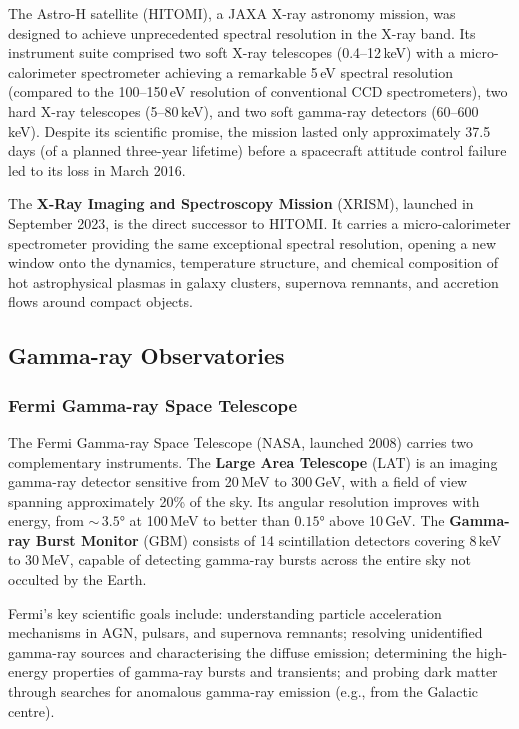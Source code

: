 The Astro-H satellite (HITOMI), a JAXA X-ray astronomy mission, was designed to achieve unprecedented spectral resolution in the X-ray band. Its instrument suite comprised two soft X-ray telescopes (0.4--12\,keV) with a micro-calorimeter spectrometer achieving a remarkable 5\,eV spectral resolution (compared to the 100--150\,eV resolution of conventional CCD spectrometers), two hard X-ray telescopes (5--80\,keV), and two soft gamma-ray detectors (60--600\,keV). Despite its scientific promise, the mission lasted only approximately 37.5 days (of a planned three-year lifetime) before a spacecraft attitude control failure led to its loss in March 2016.

The \textbf{X-Ray Imaging and Spectroscopy Mission} (XRISM), launched in September 2023, is the direct successor to HITOMI. It carries a micro-calorimeter spectrometer providing the same exceptional spectral resolution, opening a new window onto the dynamics, temperature structure, and chemical composition of hot astrophysical plasmas in galaxy clusters, supernova remnants, and accretion flows around compact objects.


\subsection{Gamma-ray Observatories} \label{subsec:gamma_observatories}

\subsubsection{Fermi Gamma-ray Space Telescope}

The Fermi Gamma-ray Space Telescope (NASA, launched 2008) carries two complementary instruments. The \textbf{Large Area Telescope} (LAT) is an imaging gamma-ray detector sensitive from 20\,MeV to 300\,GeV, with a field of view spanning approximately 20\% of the sky. Its angular resolution improves with energy, from ${\sim}\,3.5°$ at 100\,MeV to better than $0.15°$ above 10\,GeV. The \textbf{Gamma-ray Burst Monitor} (GBM) consists of 14 scintillation detectors covering 8\,keV to 30\,MeV, capable of detecting gamma-ray bursts across the entire sky not occulted by the Earth.

Fermi's key scientific goals include: understanding particle acceleration mechanisms in AGN, pulsars, and supernova remnants; resolving unidentified gamma-ray sources and characterising the diffuse emission; determining the high-energy properties of gamma-ray bursts and transients; and probing dark matter through searches for anomalous gamma-ray emission (e.g., from the Galactic centre).

